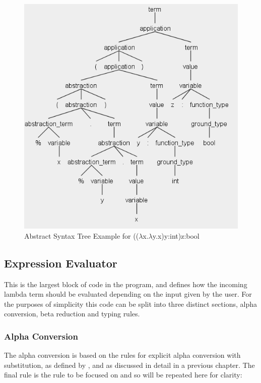 \documentclass[a4paper,11pt]{report}
\begin{document}
\begin{figure}[p]
	\centering
	\includegraphics[scale=0.8]{images/abstract_syntax_types}
	\caption{Abstract Syntax Tree Example for (($\lambda$x.$\lambda$y.x)y:int)z:bool}
	\label{abstract_syntax_tree_example}
\end{figure}

\subsection{Expression Evaluator}
This is the largest block of code in the program, and defines how the incoming lambda term should be evaluated depending on the input given by the user. For the purposes of simplicity this code can be split into three distinct sections, alpha conversion, beta reduction and typing rules.

\subsubsection{Alpha Conversion}
The alpha conversion is based on the rules for explicit alpha conversion with substitution, as defined by \cite{Acar2008}, and as discussed in detail in a previous chapter. The final rule is the rule to be focused on and so will be repeated here for clarity:
\end{document}
